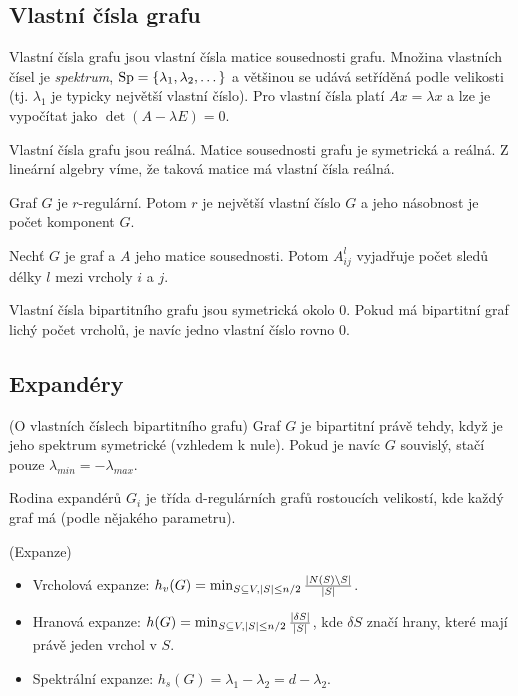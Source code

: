 
\subsection{Vlastní čísla grafu}

\df Vlastní čísla grafu jsou vlastní čísla matice sousednosti grafu. Množina 
vlastních čísel je {\it spektrum}, $\operatorname{Sp} = \{\lambda_1, \lambda_2, \dots\}$ a 
většinou se udává setříděná podle velikosti (tj. $\lambda_1$ je typicky 
největší vlastní číslo). Pro vlastní čísla platí $Ax = \lambda x$ a lze je 
vypočítat jako $\det(A - \lambda E) = 0$.

\vt Vlastní čísla grafu jsou reálná.
\dk Matice sousednosti grafu je symetrická a reálná. Z lineární algebry víme, že
taková matice má vlastní čísla reálná.

\vt Graf $G$ je $r$-regulární. Potom $r$ je největší vlastní číslo $G$ a jeho
násobnost je počet komponent $G$.

\vt Nechť $G$ je graf a $A$ jeho matice sousednosti. Potom $A^l_{ij}$ vyjadřuje
počet sledů délky $l$ mezi vrcholy $i$ a $j$.

\vt Vlastní čísla bipartitního grafu jsou symetrická okolo $0$. Pokud má
bipartitní graf lichý počet vrcholů, je navíc jedno vlastní číslo rovno $0$.

\subsection{Expandéry}

\vt (O vlastních číslech bipartitního grafu) Graf $G$ je bipartitní právě 
tehdy, když je jeho spektrum symetrické (vzhledem k nule). Pokud je navíc $G$ 
souvislý, stačí pouze $\lambda_{min} = -\lambda_{max}$.

\df Rodina expandérů $G_i$ je třída d-regulárních grafů rostoucích velikostí, 
kde každý graf má  (podle nějakého parametru).

\df (Expanze) \begin{itemize}
	\item Vrcholová expanze: $h_v(G) = \min_{S\subseteq V, |S|\leq n/2} 
	{|N(S)\setminus S| \over |S|}$.
	\item Hranová expanze: $h(G) = \min_{S\subseteq V, |S|\leq n/2} {|\delta S| 
	\over |S|}$, kde $\delta S$ značí hrany, které mají právě jeden vrchol v 
	$S$.
	\item Spektrální expanze: $h_s(G) = \lambda_1 - \lambda_2 = d - \lambda_2$.
\end{itemize}

